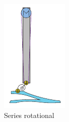 \begin{figure}[hb!]
\begin{subfigure}{.19\textwidth}
      \includegraphics[width=\linewidth]{figures/illustration_serial_rotational.pdf}
      \caption{Series rotational}
      \label{fig:series_rotational}
    \end{subfigure}
    \begin{subfigure}{.19\textwidth}
      \centering

\end{subfigure}
\end{figure}
